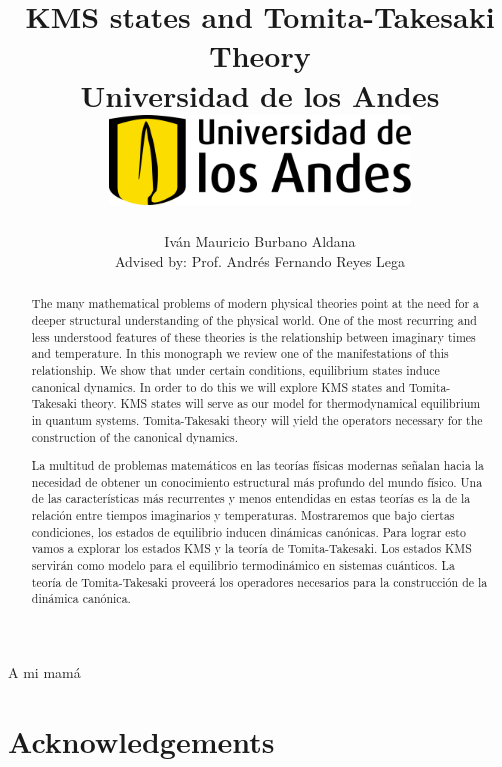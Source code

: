 \documentclass[12pt]{report}
\title 
{
	{KMS states and Tomita-Takesaki Theory}\\
	{\large Universidad de los Andes}\\
	\vspace{1.5cm}
	{\includegraphics[width = 0.6\textwidth]{logo.png}}	
}
\author{Iván Mauricio Burbano Aldana\\[1cm]{\small Advised by: Prof. Andrés Fernando Reyes Lega}}
\newenvironment{dedication}
  {\clearpage           %
   \thispagestyle{empty}%
   \vspace*{\stretch{1}}%
   \raggedleft          %
  }
  {\par %
   \vspace{\stretch{3}} %
   \clearpage           %
  }
\theoremstyle{definition}
\begin{document}

\maketitle

\begin{dedication}
{\LARGE\calligra A mi mamá}
\end{dedication}

\begin{abstract}

The many mathematical problems of modern physical theories point at the need for a deeper structural understanding of the physical world. One of the most recurring and less understood features of these theories is the relationship between imaginary times and temperature. In this monograph we review one of the manifestations of this relationship. We show that under certain conditions, equilibrium states induce canonical dynamics. In order to do this we will explore KMS states and Tomita-Takesaki theory. KMS states will serve as our model for thermodynamical equilibrium in quantum systems. Tomita-Takesaki theory will yield the operators necessary for the construction of the canonical dynamics.

\end{abstract}

\begin{otherlanguage}{spanish}
\begin{abstract}

La multitud de problemas matemáticos en las teorías físicas modernas señalan hacia la necesidad de obtener un conocimiento estructural más profundo del mundo físico. Una de las características más recurrentes y menos entendidas en estas teorías es la de la relación entre tiempos imaginarios y temperaturas. Mostraremos que bajo ciertas condiciones, los estados de equilibrio inducen dinámicas canónicas. Para lograr esto vamos a explorar los estados KMS y la teoría de Tomita-Takesaki. Los estados KMS servirán como modelo para el equilibrio termodinámico en sistemas cuánticos. La teoría de Tomita-Takesaki proveerá los operadores necesarios para la construcción de la dinámica canónica.

\end{abstract}
\end{otherlanguage}

\newpage

\chapter*{Acknowledgements}
\end{document}
